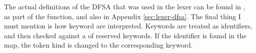\begin{figure}[H]
    \centering
\end{figure}

The actual definitions of the DFSA that was used in the lexer can be found in
, as part of the  function, and also in
Appendix \ref{sec:lexer-dfsa}. The final thing I must mention is how keyword are
interpreted. Keywords are treated as identifiers, and then checked against a
 of reserved keywords. If the identifier is found in the map, the
token kind is changed to the corresponding keyword.